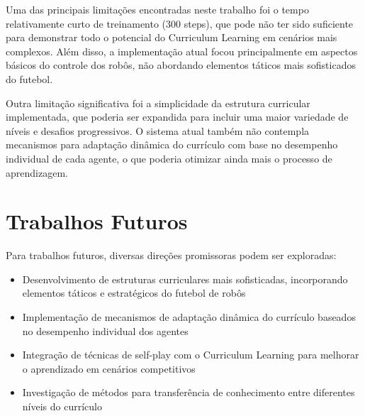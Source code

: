 Uma das principais limitações encontradas neste trabalho foi o tempo relativamente curto de treinamento (300 steps), que pode não ter sido suficiente para demonstrar todo o potencial do Curriculum Learning em cenários mais complexos. Além disso, a implementação atual focou principalmente em aspectos básicos do controle dos robôs, não abordando elementos táticos mais sofisticados do futebol.

Outra limitação significativa foi a simplicidade da estrutura curricular implementada, que poderia ser expandida para incluir uma maior variedade de níveis e desafios progressivos. O sistema atual também não contempla mecanismos para adaptação dinâmica do currículo com base no desempenho individual de cada agente, o que poderia otimizar ainda mais o processo de aprendizagem.

\section{Trabalhos Futuros}

Para trabalhos futuros, diversas direções promissoras podem ser exploradas:

\begin{itemize}
    \item Desenvolvimento de estruturas curriculares mais sofisticadas, incorporando elementos táticos e estratégicos do futebol de robôs
    \item Implementação de mecanismos de adaptação dinâmica do currículo baseados no desempenho individual dos agentes
    \item Integração de técnicas de self-play com o Curriculum Learning para melhorar o aprendizado em cenários competitivos
    \item Investigação de métodos para transferência de conhecimento entre diferentes níveis do currículo
\end{itemize}

